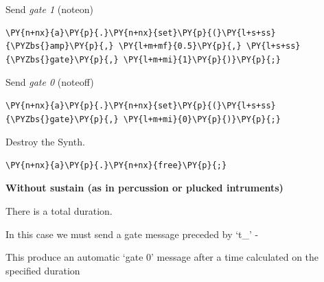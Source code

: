 Send \textit{gate 1} (noteon)

    \begin{tcolorbox}[breakable, size=fbox, boxrule=1pt, pad at break*=1mm,colback=cellbackground, colframe=cellborder]
\begin{Verbatim}[commandchars=\\\{\}]
\PY{n+nx}{a}\PY{p}{.}\PY{n+nx}{set}\PY{p}{(}\PY{l+s+ss}{\PYZbs{}amp}\PY{p}{,} \PY{l+m+mf}{0.5}\PY{p}{,} \PY{l+s+ss}{\PYZbs{}gate}\PY{p}{,} \PY{l+m+mi}{1}\PY{p}{)}\PY{p}{;}
\end{Verbatim}
\end{tcolorbox}

Send \textit{gate 0} (noteoff)

    \begin{tcolorbox}[breakable, size=fbox, boxrule=1pt, pad at break*=1mm,colback=cellbackground, colframe=cellborder]
\begin{Verbatim}[commandchars=\\\{\}]
\PY{n+nx}{a}\PY{p}{.}\PY{n+nx}{set}\PY{p}{(}\PY{l+s+ss}{\PYZbs{}gate}\PY{p}{,} \PY{l+m+mi}{0}\PY{p}{)}\PY{p}{;}
\end{Verbatim}
\end{tcolorbox}

Destroy the Synth.

    \begin{tcolorbox}[breakable, size=fbox, boxrule=1pt, pad at break*=1mm,colback=cellbackground, colframe=cellborder]
\begin{Verbatim}[commandchars=\\\{\}]
\PY{n+nx}{a}\PY{p}{.}\PY{n+nx}{free}\PY{p}{;}
\end{Verbatim}
\end{tcolorbox}

\textbf{Without sustain (as in percussion or plucked intruments)}

There is a total duration.

In this case we must send a gate message preceded by `t\_' -

This produce an automatic `gate 0' message after a time calculated on the specified duration


